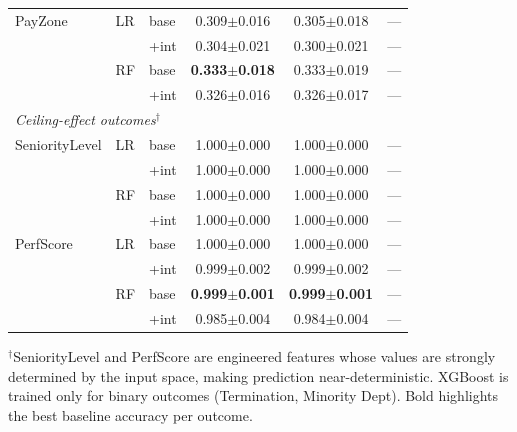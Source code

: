 \documentclass[twocolumn]{article}
\begin{document}
\begin{table}[ht]
\begin{tabular}{lllccc}
\noalign{\medskip}
PayZone & LR & base & 0.309$\pm$0.016 & 0.305$\pm$0.018 & --- \\
& & +int & 0.304$\pm$0.021 & 0.300$\pm$0.021 & --- \\
\noalign{\smallskip}
& RF & base & \textbf{0.333$\pm$0.018} & 0.333$\pm$0.019 & --- \\
& & +int & 0.326$\pm$0.016 & 0.326$\pm$0.017 & --- \\
\hline
\multicolumn{6}{l}{\textit{Ceiling-effect outcomes$^\dagger$}} \\
SeniorityLevel & LR & base & 1.000$\pm$0.000 & 1.000$\pm$0.000 & --- \\
& & +int & 1.000$\pm$0.000 & 1.000$\pm$0.000 & --- \\
\noalign{\smallskip}
& RF & base & 1.000$\pm$0.000 & 1.000$\pm$0.000 & --- \\
& & +int & 1.000$\pm$0.000 & 1.000$\pm$0.000 & --- \\
\noalign{\medskip}
PerfScore & LR & base & 1.000$\pm$0.000 & 1.000$\pm$0.000 & --- \\
& & +int & 0.999$\pm$0.002 & 0.999$\pm$0.002 & --- \\
\noalign{\smallskip}
& RF & base & \textbf{0.999$\pm$0.001} & \textbf{0.999$\pm$0.001} & --- \\
& & +int & 0.985$\pm$0.004 & 0.984$\pm$0.004 & --- \\
\hline
\end{tabular}
\footnotesize
$^\dagger$SeniorityLevel and PerfScore are engineered features whose values are strongly determined by the input space, making prediction near-deterministic. XGBoost is trained only for binary outcomes (Termination, Minority Dept). Bold highlights the best baseline accuracy per outcome.
\end{table}
\end{document}
